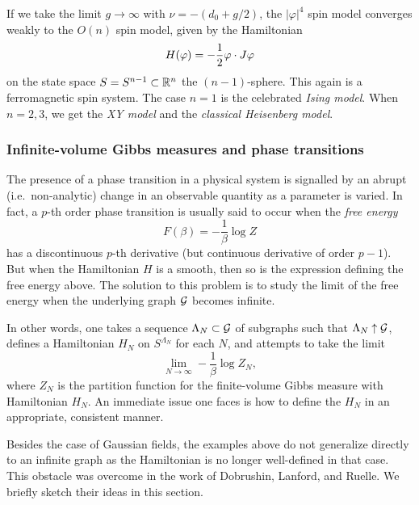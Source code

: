 If we take the limit $g\to\infty$ with $\nu = -(d_0 + g / 2)$, the
$|\varphi|^4$ spin model converges
weakly to the $O(n)$ spin model, given by the Hamiltonian
\begin{equation}
H(\varphi) = -\frac{1}{2} \varphi \cdot J \varphi
\end{equation}
on the state space $S = S^{n-1} \subset {\mathbb R}^n$ the $(n-1)$-sphere.
This again is a ferromagnetic spin system.
The case $n = 1$ is the celebrated \emph{Ising model}. When $n = 2, 3$,
we get the \emph{XY model} and the \emph{classical Heisenberg model}.


\subsubsection{Infinite-volume Gibbs measures and phase transitions}


The presence of a phase transition in a physical system is signalled by an abrupt
(i.e.\ non-analytic) change in an observable quantity as a parameter is varied. In fact,
a $p$-th order phase transition is usually said to occur when the \emph{free energy}
\begin{equation}
F(\beta) = -\frac{1}{\beta} \log Z
\end{equation}
has a discontinuous $p$-th derivative (but continuous derivative of order $p - 1$).
But when the Hamiltonian $H$ is a smooth, then so is the expression defining the free
energy above. The solution to this problem is to study the limit of the free energy
when the underlying graph $\mathcal{G}$ becomes infinite.

In other words, one takes a sequence $\Lambda_N \subset \mathcal{G}$ of subgraphs such that
$\Lambda_N \uparrow \mathcal{G}$, defines a Hamiltonian $H_N$ on $S^{\Lambda_N}$ for each $N$,
and attempts to take the limit
\begin{equation}
\lim_{N\to\infty} -\frac{1}{\beta} \log Z_N,
\end{equation}
where $Z_N$ is the partition function for the finite-volume Gibbs measure with Hamiltonian
$H_N$. An immediate issue one faces is how to define the $H_N$ in an appropriate, consistent
manner.

Besides the case of Gaussian fields, the examples above do not generalize directly to an infinite
graph as the Hamiltonian is no longer well-defined in that case. This obstacle was overcome in the
work of Dobrushin, Lanford, and Ruelle. We briefly sketch their ideas in this section.

